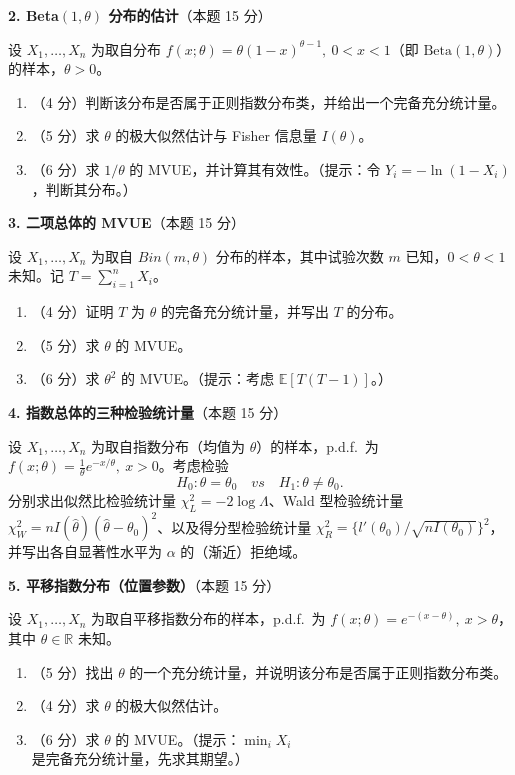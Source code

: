\documentclass[12pt,a4paper]{ctexart}
\newcommand{\question}[2]{\bigskip\noindent\textbf{#1}\quad（本题 #2 分）\par\nobreak\medskip}
\newcommand{\E}{\mathbb{E}}
\begin{document}
\question{2. Beta$(1,\theta)$ 分布的估计}{15}
设 $X_1,\dots,X_n$ 为取自分布 $f(x;\theta)=\theta(1-x)^{\theta-1},\ 0<x<1$（即 $\mathrm{Beta}(1,\theta)$）的样本，$\theta>0$。
\begin{enumerate}[label=(\arabic*),leftmargin=2.2em]
  \item （4 分）判断该分布是否属于正则指数分布类，并给出一个完备充分统计量。
  \item （5 分）求 $\theta$ 的极大似然估计与 Fisher 信息量 $I(\theta)$。
  \item （6 分）求 $1/\theta$ 的 MVUE，并计算其有效性。（提示：令 $Y_i=-\ln(1-X_i)$，判断其分布。）
\end{enumerate}

\question{3. 二项总体的 MVUE}{15}
设 $X_1,\dots,X_n$ 为取自 $Bin(m,\theta)$ 分布的样本，其中试验次数 $m$ 已知，$0<\theta<1$ 未知。记 $T=\sum_{i=1}^n X_i$。
\begin{enumerate}[label=(\arabic*),leftmargin=2.2em]
  \item （4 分）证明 $T$ 为 $\theta$ 的完备充分统计量，并写出 $T$ 的分布。
  \item （5 分）求 $\theta$ 的 MVUE。
  \item （6 分）求 $\theta^2$ 的 MVUE。（提示：考虑 $\E[T(T-1)]$。）
\end{enumerate}

\question{4. 指数总体的三种检验统计量}{15}
设 $X_1,\dots,X_n$ 为取自指数分布（均值为 $\theta$）的样本，p.d.f.\ 为 $f(x;\theta)=\frac1\theta e^{-x/\theta},\ x>0$。考虑检验
\[ H_0:\theta=\theta_0 \quad vs \quad H_1:\theta\neq\theta_0. \]
分别求出似然比检验统计量 $\chi_L^2=-2\log\Lambda$、Wald 型检验统计量 $\chi_W^2=nI(\hat\theta)(\hat\theta-\theta_0)^2$、以及得分型检验统计量 $\chi_R^2=\{l'(\theta_0)/\sqrt{nI(\theta_0)}\}^2$，并写出各自显著性水平为 $\alpha$ 的（渐近）拒绝域。

\question{5. 平移指数分布（位置参数）}{15}
设 $X_1,\dots,X_n$ 为取自平移指数分布的样本，p.d.f.\ 为 $f(x;\theta)=e^{-(x-\theta)},\ x>\theta$，其中 $\theta\in\mathbb R$ 未知。
\begin{enumerate}[label=(\arabic*),leftmargin=2.2em]
  \item （5 分）找出 $\theta$ 的一个充分统计量，并说明该分布是否属于正则指数分布类。
  \item （4 分）求 $\theta$ 的极大似然估计。
  \item （6 分）求 $\theta$ 的 MVUE。（提示：$\min_i X_i$ 是完备充分统计量，先求其期望。）
\end{enumerate}
\end{document}
